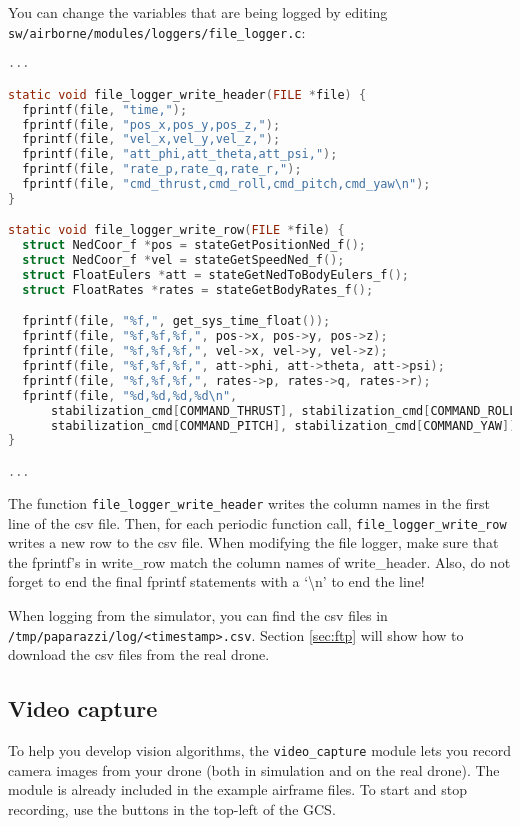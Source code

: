 \documentclass{article}
\begin{document}
You can change the variables that are being logged by editing \texttt{sw/airborne/modules/loggers/file\_logger.c}:
\begin{lstlisting}[language=c]
...

static void file_logger_write_header(FILE *file) {
  fprintf(file, "time,");
  fprintf(file, "pos_x,pos_y,pos_z,");
  fprintf(file, "vel_x,vel_y,vel_z,");
  fprintf(file, "att_phi,att_theta,att_psi,");
  fprintf(file, "rate_p,rate_q,rate_r,");
  fprintf(file, "cmd_thrust,cmd_roll,cmd_pitch,cmd_yaw\n");
}

static void file_logger_write_row(FILE *file) {
  struct NedCoor_f *pos = stateGetPositionNed_f();
  struct NedCoor_f *vel = stateGetSpeedNed_f();
  struct FloatEulers *att = stateGetNedToBodyEulers_f();
  struct FloatRates *rates = stateGetBodyRates_f();

  fprintf(file, "%f,", get_sys_time_float());
  fprintf(file, "%f,%f,%f,", pos->x, pos->y, pos->z);
  fprintf(file, "%f,%f,%f,", vel->x, vel->y, vel->z);
  fprintf(file, "%f,%f,%f,", att->phi, att->theta, att->psi);
  fprintf(file, "%f,%f,%f,", rates->p, rates->q, rates->r);
  fprintf(file, "%d,%d,%d,%d\n",
      stabilization_cmd[COMMAND_THRUST], stabilization_cmd[COMMAND_ROLL],
      stabilization_cmd[COMMAND_PITCH], stabilization_cmd[COMMAND_YAW]);
}

...
\end{lstlisting}
The function \texttt{file\_logger\_write\_header} writes the column names in the first line of the csv file. Then, for each periodic function call, \texttt{file\_logger\_write\_row} writes a new row to the csv file. When modifying the file logger, make sure that the fprintf's in write\_row match the column names of write\_header. Also, do not forget to end the final fprintf statements with a `\textbackslash n' to end the line!

When logging from the simulator, you can find the csv files in \texttt{/tmp/paparazzi/log/<timestamp>.csv}.
Section \ref{sec:ftp} will show how to download the csv files from the real drone.


\subsection{Video capture}
To help you develop vision algorithms, the \texttt{video\_capture} module lets you record camera images from your drone (both in simulation and on the real drone). The module is already included in the example airframe files. To start and stop recording, use the buttons in the top-left of the GCS.
\end{document}
